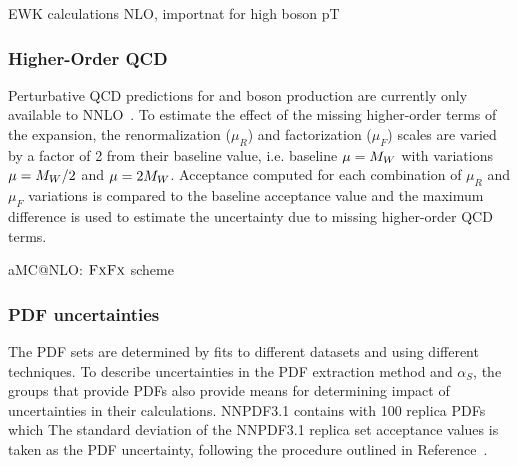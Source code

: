 EWK calculations NLO, importnat for high boson pT
~\cite{Dittmaier:2014qza,Lindert:2017olm}

\subsubsection{Higher-Order QCD}
Perturbative QCD predictions for \W and \Z boson production are currently only available to NNLO~\cite{Melnikov:2006kv,Catani:2009sm}. To estimate the effect of the missing higher-order terms of the expansion, the renormalization ($\mu_R$) and factorization ($\mu_F$) scales are varied by a factor of 2 from their baseline value, i.e. baseline $\mu = M_{W}$ with variations $\mu=M_{W}/2$ and $\mu=2M_{W}$. Acceptance computed for each combination of $\mu_R$ and $\mu_F$ variations is compared to the baseline acceptance value and the maximum difference is used to estimate the uncertainty due to missing higher-order QCD terms.

aMC@NLO:
 $\textsc{FxFx}$ scheme~\cite{Frederix:2012ps}

\subsubsection{PDF uncertainties}
The PDF sets are determined by fits to different datasets and using different techniques. To describe uncertainties in the PDF extraction method and $\alpha_S$, the groups that provide PDFs also provide means for determining impact of uncertainties in their calculations. NNPDF3.1 contains with 100 replica PDFs which 
The standard deviation of the NNPDF3.1 replica set acceptance values is taken as the PDF uncertainty, following the procedure outlined in Reference~\cite{Butterworth:2015oua}.

